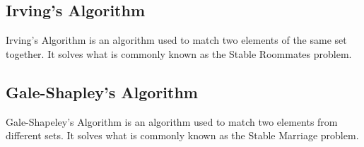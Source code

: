 \documentclass[journal]{./IEEE/IEEEtran}
\begin{document}
\subsection{Irving's Algorithm}
Irving's Algorithm is an algorithm used to match two elements of the same set together. It solves what is commonly known as the Stable Roommates problem.

\subsection{Gale-Shapley's Algorithm}
Gale-Shapeley's Algorithm is an algorithm used to match two elements from different sets. It solves what is commonly known as the Stable Marriage problem.




\newpage
\appendices
\end{document}
